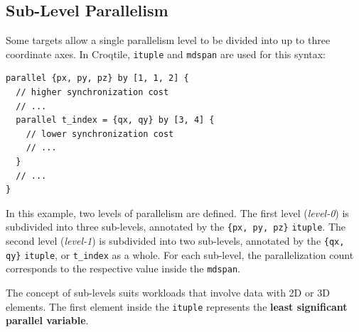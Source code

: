 \subsection*{Sub-Level Parallelism}

Some targets allow a single parallelism level to be divided into up to three coordinate axes. In Croqtile, \texttt{ituple} and \texttt{mdspan} are used for this syntax:

\begin{lstlisting}[language=croqtile,caption={Sub-Level Parallelism}]
parallel {px, py, pz} by [1, 1, 2] {
  // higher synchronization cost
  // ...
  parallel t_index = {qx, qy} by [3, 4] {
    // lower synchronization cost
    // ...
  }
  // ...
}
\end{lstlisting}

In this example, two levels of parallelism are defined. The first level (\emph{level-0}) is subdivided into three sub-levels, annotated by the \texttt{\{px, py, pz\}} \texttt{ituple}. The second level (\emph{level-1}) is subdivided into two sub-levels, annotated by the \texttt{\{qx, qy\}} \texttt{ituple}, or \texttt{t\_index} as a whole. For each sub-level, the parallelization count corresponds to the respective value inside the \texttt{mdspan}.

The concept of sub-levels suits workloads that involve data with 2D or 3D elements. The first element inside the \texttt{ituple} represents the \textbf{least significant parallel variable}.
